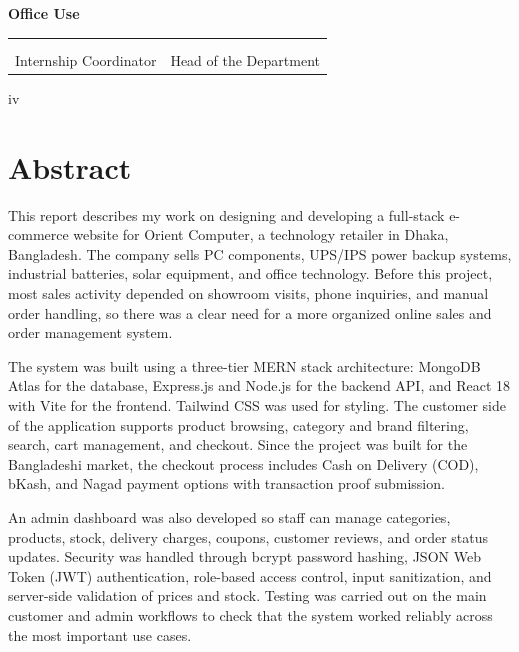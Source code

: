 \documentclass[12pt,a4paper,oneside]{report}
\begin{document}
\vspace{0.8cm}
\noindent\textbf{Office Use}
\vspace{0.2cm}

\begin{center}
\begin{tabular}{|p{}|p{}|}
\hline
\vspace{1.4cm} & \vspace{1.4cm} \\
\centering\dotfill & \centering\dotfill \tabularnewline
\centering Internship Coordinator & \centering Head of the Department \tabularnewline
\hline
\end{tabular}
\end{center}

\vfill
\begin{center}\small iv\end{center}

\newpage
\chapter*{Abstract}

This report describes my work on designing and developing a full-stack e-commerce website for Orient Computer, a technology retailer in Dhaka, Bangladesh. The company sells PC components, UPS/IPS power backup systems, industrial batteries, solar equipment, and office technology. Before this project, most sales activity depended on showroom visits, phone inquiries, and manual order handling, so there was a clear need for a more organized online sales and order management system.

\vspace{0.3cm}
The system was built using a three-tier MERN stack architecture: MongoDB Atlas for the database, Express.js and Node.js for the backend API, and React 18 with Vite for the frontend. Tailwind CSS was used for styling. The customer side of the application supports product browsing, category and brand filtering, search, cart management, and checkout. Since the project was built for the Bangladeshi market, the checkout process includes Cash on Delivery (COD), bKash, and Nagad payment options with transaction proof submission.

\vspace{0.3cm}
An admin dashboard was also developed so staff can manage categories, products, stock, delivery charges, coupons, customer reviews, and order status updates. Security was handled through bcrypt password hashing, JSON Web Token (JWT) authentication, role-based access control, input sanitization, and server-side validation of prices and stock. Testing was carried out on the main customer and admin workflows to check that the system worked reliably across the most important use cases.
\end{document}
